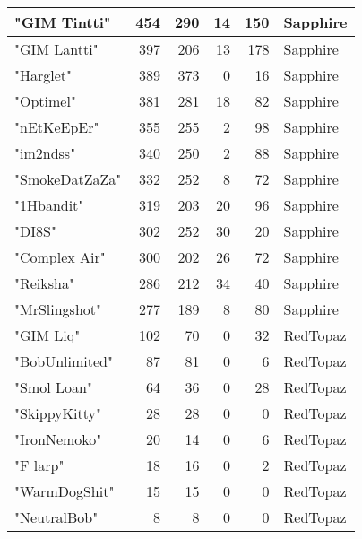 \documentclass{article}
\begin{document}
\begin{table}[htbp]
\begin{tabular}{|l|r|r|r|r|l|}
"GIM Tintti" & 454 & 290 & 14 & 150 & Sapphire \\ \hline
"GIM Lantti" & 397 & 206 & 13 & 178 & Sapphire \\ \hline
"Harglet" & 389 & 373 & 0 & 16 & Sapphire \\ \hline
"Optimel" & 381 & 281 & 18 & 82 & Sapphire \\ \hline
"nEtKeEpEr" & 355 & 255 & 2 & 98 & Sapphire \\ \hline
"im2ndss" & 340 & 250 & 2 & 88 & Sapphire \\ \hline
"SmokeDatZaZa" & 332 & 252 & 8 & 72 & Sapphire \\ \hline
"1Hbandit" & 319 & 203 & 20 & 96 & Sapphire \\ \hline
"DI8S" & 302 & 252 & 30 & 20 & Sapphire \\ \hline
"Complex Air" & 300 & 202 & 26 & 72 & Sapphire \\ \hline
"Reiksha" & 286 & 212 & 34 & 40 & Sapphire \\ \hline
"MrSlingshot" & 277 & 189 & 8 & 80 & Sapphire \\ \hline
"GIM Liq" & 102 & 70 & 0 & 32 & RedTopaz \\ \hline
"BobUnlimited" & 87 & 81 & 0 & 6 & RedTopaz \\ \hline
"Smol Loan" & 64 & 36 & 0 & 28 & RedTopaz \\ \hline
"SkippyKitty" & 28 & 28 & 0 & 0 & RedTopaz \\ \hline
"IronNemoko" & 20 & 14 & 0 & 6 & RedTopaz \\ \hline
"F larp" & 18 & 16 & 0 & 2 & RedTopaz \\ \hline
"WarmDogShit" & 15 & 15 & 0 & 0 & RedTopaz \\ \hline
"NeutralBob" & 8 & 8 & 0 & 0 & RedTopaz \\ \hline
\end{tabular}
\end{table}
\end{document}
